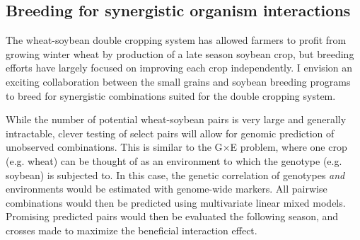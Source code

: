 \documentclass[11pt]{article}
\begin{document}
\subsection*{Breeding for synergistic organism interactions}

The wheat-soybean double cropping system has allowed farmers to profit from growing winter wheat by production of a late season soybean crop, but breeding efforts have largely focused on improving each crop independently. I envision an exciting collaboration between the small grains and soybean breeding programs to breed for synergistic combinations suited for the double cropping system. 


While the number of potential wheat-soybean pairs is very large and generally intractable, clever testing of select pairs will allow for genomic prediction of unobserved combinations. This is similar to the G$\times$E problem, where one crop (e.g. wheat) can be thought of as an environment to which the genotype (e.g. soybean) is subjected to. In this case, the genetic correlation of genotypes \emph{and} environments would be estimated with genome-wide markers. All pairwise combinations would then be predicted using multivariate linear mixed models. Promising predicted pairs would then be evaluated the following season, and crosses made to maximize the beneficial interaction effect. %

\end{document}
